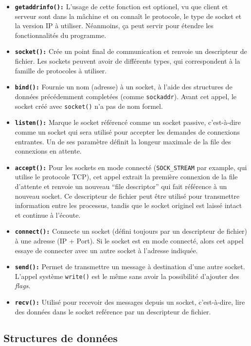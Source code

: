 \documentclass[11pt,a4paper]{article}
\begin{document}
\begin{itemize}
\item \texttt{\textbf{getaddrinfo():}} L'usage de cette fonction est optionel,
  vu que client et serveur sont dans la mâchine et on connaît le
  protocole, le type de socket et la version IP à utiliser. Néanmoins,
  ça peut servir pour étendre les fonctionnalités du programme.
\item \texttt{\textbf{socket():}} Crée un point final de communication et
  renvoie un descripteur de fichier. Les sockets peuvent avoir de
  différents types, qui correspondent à la famille de protocoles à
  utiliser.
\item \texttt{\textbf{bind():}} Fournie un nom (adresse) à un socket, à l'aide
  des structures de données précédemment completées (comme
  \texttt{sockaddr}). Avant cet appel, le socket créé avec
  \texttt{socket()} n'a pas de nom formel.
\item \texttt{\textbf{listen():}} Marque le socket référencé comme un
  socket passive, c'est-à-dire comme un socket qui sera utilisé pour
  accepter les demandes de connexions entrantes. Un de ses paramètre
  définit la longeur maximale de la file des connexions en attente.
\item \texttt{\textbf{accept():}} Pour les sockets en mode connecté
  (\texttt{SOCK\_STREAM} par example, qui utilise le protocole TCP),
  cet appel extrait la première connexion de la file d'attente et
  renvoie un nouveau ``file descriptor'' qui fait référence à un
  nouveau socket. Ce descripteur de fichier peut être utilisé pour
  transmettre information entre les processus, tandis que le socket
  originel est laissé intact et continue à l'écoute.
\item \texttt{\textbf{connect():}} Connecte un socket (défini toujours
  par un descripteur de fichier) à une adresse (IP + Port). Si le
  socket est en mode connecté, alors cet appel essaye de connecter
  avec un autre socket à l'adresse indiquée.
\item \texttt{\textbf{send():}} Permet de transmettre un message à destination
  d'une autre socket. L'appel système \texttt{write()} est le même
  sans avoir la possibilité d'ajouter des \emph{flags}.
\item \texttt{\textbf{recv():}} Utilisé pour recevoir des messages
  depuis un socket, c'est-à-dire, lire des données dans le socket
  reférence par un descripteur de fichier.
\end{itemize}


\subsection{Structures de données}
\label{sec:struct}
\end{document}
